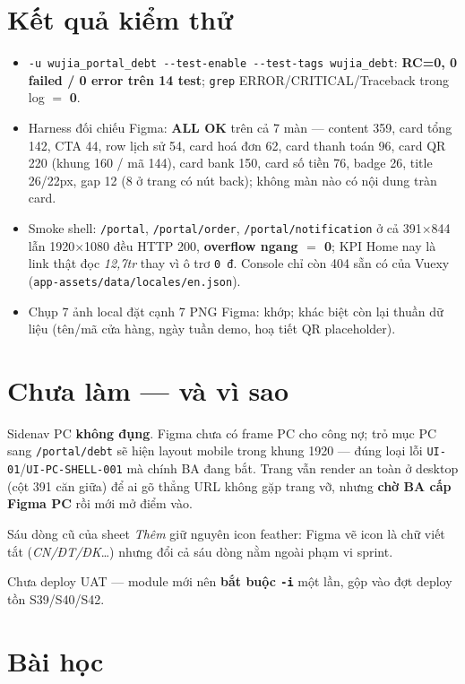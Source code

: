 \section{Kết quả kiểm thử}

\begin{itemize}
  \item \texttt{-u wujia\_portal\_debt -{}-test-enable -{}-test-tags wujia\_debt}: \textbf{RC=0,
    0 failed / 0 error trên 14 test}; \texttt{grep} ERROR/CRITICAL/Traceback trong log $=$ \textbf{0}.
  \item Harness đối chiếu Figma: \textbf{ALL OK} trên cả 7 màn --- content 359, card tổng 142,
    CTA 44, row lịch sử 54, card hoá đơn 62, card thanh toán 96, card QR 220 (khung 160 / mã 144),
    card bank 150, card số tiền 76, badge 26, title 26/22px, gap 12 (8 ở trang có nút back);
    không màn nào có nội dung tràn card.
  \item Smoke shell: \texttt{/portal}, \texttt{/portal/order}, \texttt{/portal/notification} ở cả
    391$\times$844 lẫn 1920$\times$1080 đều HTTP 200, \textbf{overflow ngang $=$ 0}; KPI Home nay là
    link thật đọc \emph{12,7tr} thay vì ô trơ \texttt{0 đ}. Console chỉ còn 404 sẵn có của Vuexy
    (\texttt{app-assets/data/locales/en.json}).
  \item Chụp 7 ảnh local đặt cạnh 7 PNG Figma: khớp; khác biệt còn lại thuần dữ liệu (tên/mã cửa
    hàng, ngày tuần demo, hoạ tiết QR placeholder).
\end{itemize}

\section{Chưa làm --- và vì sao}

Sidenav PC \textbf{không đụng}. Figma chưa có frame PC cho công nợ; trỏ mục PC sang
\texttt{/portal/debt} sẽ hiện layout mobile trong khung 1920 --- đúng loại lỗi
\texttt{UI-01}/\texttt{UI-PC-SHELL-001} mà chính BA đang bắt. Trang vẫn render an toàn ở desktop
(cột 391 căn giữa) để ai gõ thẳng URL không gặp trang vỡ, nhưng \textbf{chờ BA cấp Figma PC} rồi mới
mở điểm vào.

Sáu dòng cũ của sheet \emph{Thêm} giữ nguyên icon feather: Figma vẽ icon là chữ viết tắt
(\emph{CN/ĐT/ĐK}\ldots) nhưng đổi cả sáu dòng nằm ngoài phạm vi sprint.

Chưa deploy UAT --- module mới nên \textbf{bắt buộc \texttt{-i}} một lần, gộp vào đợt deploy tồn
S39/S40/S42.

\section{Bài học}

